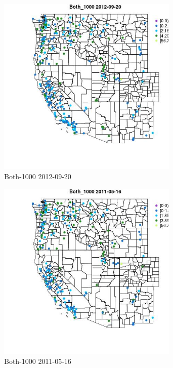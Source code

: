 \begin{figure} 
\centering  
\includegraphics[width=0.77\textwidth]{Code_Outputs/ML_input_report_ML_input_PM25_Step5_part_d_de_duplicated_aves_ML_input_MapObsBoth_10002012-09-20.jpg} 
\caption{\label{fig:ML_input_report_ML_input_PM25_Step5_part_d_de_duplicated_aves_ML_inputMapObsBoth_10002012-09-20}Both-1000 2012-09-20} 
\end{figure} 
 

\begin{figure} 
\centering  
\includegraphics[width=0.77\textwidth]{Code_Outputs/ML_input_report_ML_input_PM25_Step5_part_d_de_duplicated_aves_ML_input_MapObsBoth_10002011-05-16.jpg} 
\caption{\label{fig:ML_input_report_ML_input_PM25_Step5_part_d_de_duplicated_aves_ML_inputMapObsBoth_10002011-05-16}Both-1000 2011-05-16} 
\end{figure} 
 

